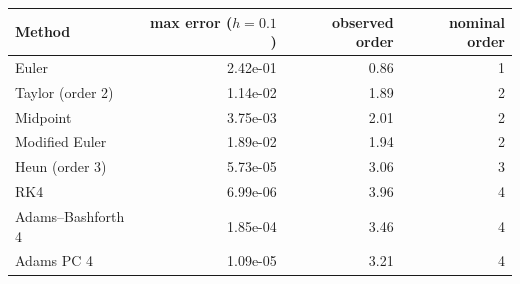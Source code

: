 \begin{tabular}{l r r r}\hline
Method & max error ($h=0.1$) & observed order & nominal order \\
\hline
Euler & 2.42e-01 & 0.86 & 1 \\
Taylor (order 2) & 1.14e-02 & 1.89 & 2 \\
Midpoint & 3.75e-03 & 2.01 & 2 \\
Modified Euler & 1.89e-02 & 1.94 & 2 \\
Heun (order 3) & 5.73e-05 & 3.06 & 3 \\
RK4 & 6.99e-06 & 3.96 & 4 \\
Adams--Bashforth 4 & 1.85e-04 & 3.46 & 4 \\
Adams PC 4 & 1.09e-05 & 3.21 & 4 \\
\hline
\end{tabular}
